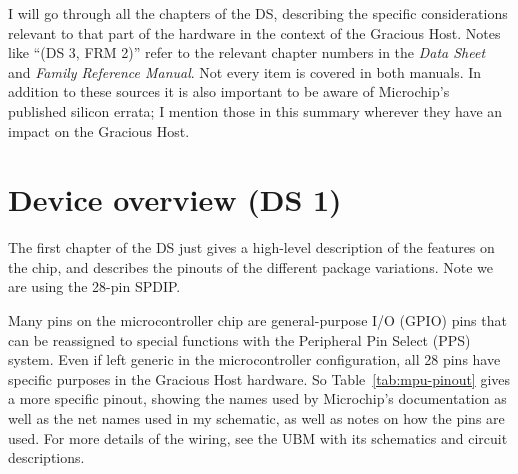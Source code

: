 I will go through all the chapters of the DS, describing the specific
considerations relevant to that part of the hardware in the context of the
Gracious Host.  Notes like ``(DS 3, FRM 2)'' refer to the relevant
chapter numbers in the \emph{Data Sheet} and \emph{Family Reference Manual}. 
Not every item is covered in both manuals.  In addition to these sources it
is also important to be aware of Microchip's published silicon errata; I
mention those in this summary wherever they have an impact on the Gracious
Host.


\section{Device overview (DS 1)}

The first chapter of the DS just gives a high-level description of the
features on the chip, and describes the pinouts of the different package
variations.  Note we are using the 28-pin SPDIP.

Many pins on the microcontroller chip are general-purpose I/O (GPIO) pins
that can be reassigned to special functions with the Peripheral Pin Select
(PPS) system.  Even if left generic in the microcontroller configuration,
all 28 pins have specific purposes in the Gracious Host hardware.  So
Table~\ref{tab:mpu-pinout} gives a more specific pinout, showing the names
used by Microchip's documentation as well as the net names used in my
schematic, as well as notes on how the pins are used.  For more details of the
wiring, see the UBM with its schematics and circuit
descriptions.

